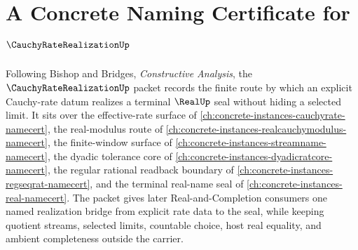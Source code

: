 \chapter{A Concrete Naming Certificate for $\CauchyRateRealizationUp$}
\label{ch:concrete-instances-cauchy-rate-realization-namecert}

Following Bishop and Bridges, \emph{Constructive Analysis}, the $\CauchyRateRealizationUp$ packet records the finite route by which an explicit Cauchy-rate datum realizes a terminal $\RealUp$ seal without hiding a selected limit. It sits over the effective-rate surface of \autoref{ch:concrete-instances-cauchyrate-namecert}, the real-modulus route of \autoref{ch:concrete-instances-realcauchymodulus-namecert}, the finite-window surface of \autoref{ch:concrete-instances-streamname-namecert}, the dyadic tolerance core of \autoref{ch:concrete-instances-dyadicratcore-namecert}, the regular rational readback boundary of \autoref{ch:concrete-instances-regseqrat-namecert}, and the terminal real-name seal of \autoref{ch:concrete-instances-real-namecert}. The packet gives later Real-and-Completion consumers one named realization bridge from explicit rate data to the seal, while keeping quotient streams, selected limits, countable choice, host real equality, and ambient completeness outside the carrier.

